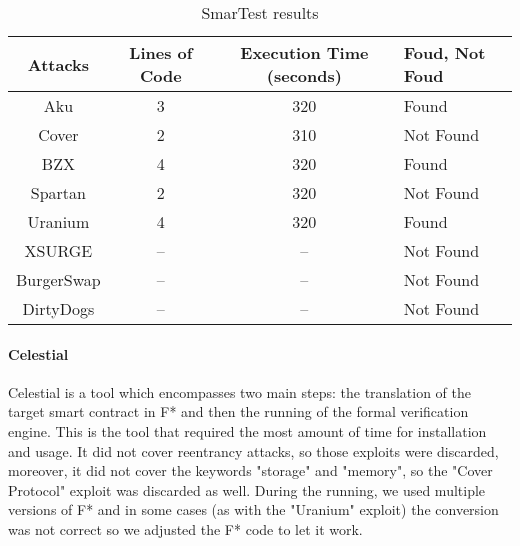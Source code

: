 \begin{center}
    \begin{table*}
        \caption{SmarTest results}
            \label{tab:SmarTestTable}
            \begin{tabular}{cccl}
            \toprule
                Attacks & Lines of Code & Execution Time (seconds) & Foud, Not Foud\\
                \midrule
                Aku & 3 & 320 & Found \\ 
                Cover & 2 & 310& Not Found\\ 
                BZX  & 4 & 320 & Found\\ 
                Spartan & 2 & 320& Not Found\\ 
                Uranium  & 4 & 320 & Found \\ 
                XSURGE &  -- & -- & Not Found \\  
                BurgerSwap &  -- & -- & Not Found\\ 
                DirtyDogs &  -- & -- & Not Found \\
            \bottomrule
            \end{tabular}
        \end{table*}
\end{center}


\paragraph{Celestial} 
Celestial is a tool which encompasses two main steps: the translation of the target smart contract in F* and then the running of the formal verification engine. 
This is the tool that required the most amount of time for installation and usage. 
It did not cover reentrancy attacks, so those exploits were discarded, moreover, it did not cover the keywords "storage" and "memory", 
so the "Cover Protocol" exploit was discarded as well. 
During the running, we used multiple versions of F* and in some cases (as with the "Uranium" exploit) the conversion was not correct so we adjusted the F* code to let it work. 

